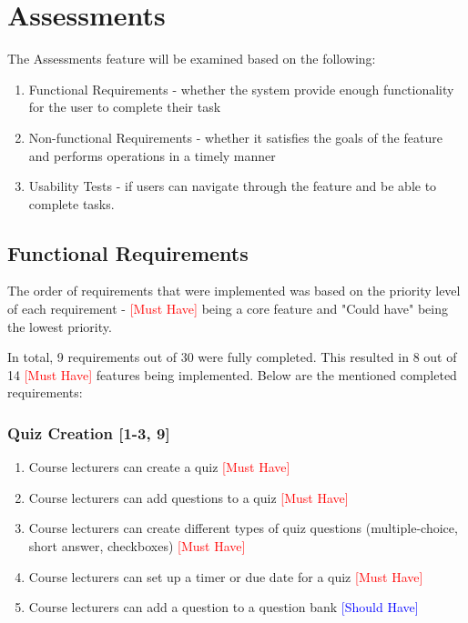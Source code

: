 \section{Assessments}

The Assessments feature will be examined based on the following:
\begin{enumerate}
	\item Functional Requirements - whether the system provide enough functionality for the user to complete their task
	\item Non-functional Requirements - whether it satisfies the goals of the feature and performs operations in a timely manner
	\item Usability Tests - if users can navigate through the feature and be able to complete tasks.
\end{enumerate}

\subsection{Functional Requirements}
The order of requirements that were implemented was based on the priority level of each requirement - \textcolor{Red}{[Must Have]} being a core feature and "Could have" being the lowest priority. 

In total, 9 requirements out of 30 were fully completed. This resulted in 8 out of 14 \textcolor{Red}{[Must Have]} features being implemented. Below are the mentioned completed requirements:

\subsubsection{Quiz Creation [1-3, 9]}
\begin{enumerate}
	\item Course lecturers can create a quiz \textcolor{Red}{[Must Have]}
	\item Course lecturers can add questions to a quiz \textcolor{Red}{[Must Have]}
	\item Course lecturers can create different types of quiz questions (multiple-choice, short answer, checkboxes) \textcolor{Red}{[Must Have]}
	\item Course lecturers can set up a timer or due date for a quiz \textcolor{Red}{[Must Have]}
		\item Course lecturers can add a question to a question bank \textcolor{Blue}{[Should Have]}
\end{enumerate}

